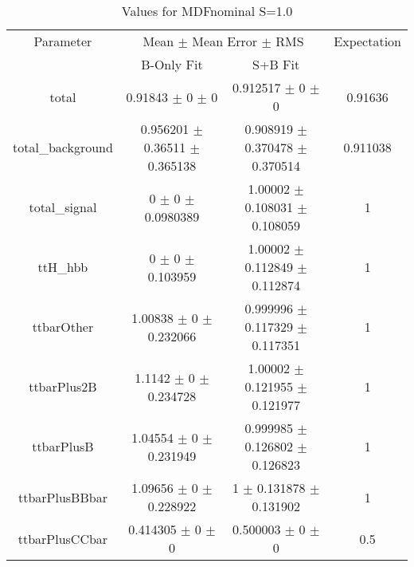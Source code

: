 \begin{table}
\centering
\caption{Values for MDFnominal S=1.0}
\begin{tabular}{cccc}
\toprule
Parameter & \multicolumn{2}{c}{Mean $\pm$ Mean Error $\pm$ RMS} & Expectation\\
 & B-Only Fit & S+B Fit & \\
\midrule
total & \num{0.91843} $\pm$ \num{0} $\pm$ \num{0} & \num{0.912517} $\pm$ \num{0} $\pm$ \num{0} & \num{0.91636}\\
total\_background & \num{0.956201} $\pm$ \num{0.36511} $\pm$ \num{0.365138} & \num{0.908919} $\pm$ \num{0.370478} $\pm$ \num{0.370514} & \num{0.911038}\\
total\_signal & \num{0} $\pm$ \num{0} $\pm$ \num{0.0980389} & \num{1.00002} $\pm$ \num{0.108031} $\pm$ \num{0.108059} & \num{1}\\
ttH\_hbb & \num{0} $\pm$ \num{0} $\pm$ \num{0.103959} & \num{1.00002} $\pm$ \num{0.112849} $\pm$ \num{0.112874} & \num{1}\\
ttbarOther & \num{1.00838} $\pm$ \num{0} $\pm$ \num{0.232066} & \num{0.999996} $\pm$ \num{0.117329} $\pm$ \num{0.117351} & \num{1}\\
ttbarPlus2B & \num{1.1142} $\pm$ \num{0} $\pm$ \num{0.234728} & \num{1.00002} $\pm$ \num{0.121955} $\pm$ \num{0.121977} & \num{1}\\
ttbarPlusB & \num{1.04554} $\pm$ \num{0} $\pm$ \num{0.231949} & \num{0.999985} $\pm$ \num{0.126802} $\pm$ \num{0.126823} & \num{1}\\
ttbarPlusBBbar & \num{1.09656} $\pm$ \num{0} $\pm$ \num{0.228922} & \num{1} $\pm$ \num{0.131878} $\pm$ \num{0.131902} & \num{1}\\
ttbarPlusCCbar & \num{0.414305} $\pm$ \num{0} $\pm$ \num{0} & \num{0.500003} $\pm$ \num{0} $\pm$ \num{0} & \num{0.5}\\
\bottomrule
\end{tabular}
\end{table}